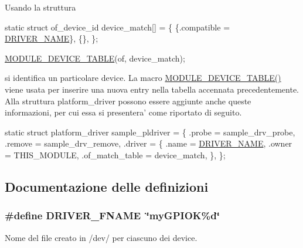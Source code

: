 Usando la struttura


\begin{DoxyCode}
\textcolor{keyword}{static} \textcolor{keyword}{struct }of\_device\_id device\_match[] = \{
        \{.compatible = \hyperlink{group___linux-_driver_ga25634d21648ca7fb7a2aca614bafaaeb}{DRIVER\_NAME}\},
        \{\},
\};

\hyperlink{group___linux-_driver_gaf33e020610cd80a1cfa2ed79b512b841}{MODULE\_DEVICE\_TABLE}(of, device\_match);
\end{DoxyCode}


si identifica un particolare device. La macro \hyperlink{group___linux-_driver_gaf33e020610cd80a1cfa2ed79b512b841}{M\+O\+D\+U\+L\+E\+\_\+\+D\+E\+V\+I\+C\+E\+\_\+\+T\+A\+B\+L\+E()} viene usata per inserire una nuova entry nella tabella accennata precedentemente. Alla struttura platform\+\_\+driver possono essere aggiunte anche queste informazioni, per cui essa si presentera' come riportato di seguito.


\begin{DoxyCode}
\textcolor{keyword}{static} \textcolor{keyword}{struct }platform\_driver sample\_pldriver = \{
    .probe  = sample\_drv\_probe,
    .remove = sample\_drv\_remove,
    .driver = \{
        .name  = \hyperlink{group___linux-_driver_ga25634d21648ca7fb7a2aca614bafaaeb}{DRIVER\_NAME},
        .owner = THIS\_MODULE,
        .of\_match\_table = device\_match,
    \},
\};
\end{DoxyCode}
 

\subsection{Documentazione delle definizioni}
\hypertarget{group___linux-_driver_ga4fa7cb23649a4090e79e2610b7ba0a93}{
\subsubsection[{D\+R\+I\+V\+E\+R\+\_\+\+F\+N\+A\+M\+E}]{\setlength{\rightskip}{0pt plus 5cm}\#define D\+R\+I\+V\+E\+R\+\_\+\+F\+N\+A\+M\+E~\char`\"{}my\+G\+P\+I\+O\+K\%d\char`\"{}}}\label{group___linux-_driver_ga4fa7cb23649a4090e79e2610b7ba0a93}


Nome del file creato in /dev/ per ciascuno dei device. 


